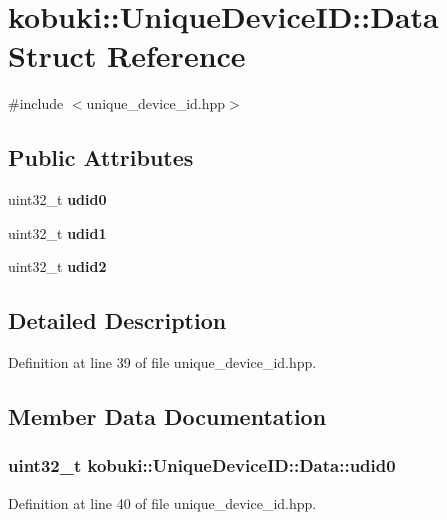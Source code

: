 \section{kobuki\-:\-:\-Unique\-Device\-I\-D\-:\-:\-Data \-Struct \-Reference}
\label{structkobuki_1_1UniqueDeviceID_1_1Data}


{\ttfamily \#include $<$unique\-\_\-device\-\_\-id.\-hpp$>$}

\subsection*{\-Public \-Attributes}
\begin{DoxyCompactItemize}
\item 
uint32\-\_\-t {\bf udid0}
\item 
uint32\-\_\-t {\bf udid1}
\item 
uint32\-\_\-t {\bf udid2}
\end{DoxyCompactItemize}


\subsection{\-Detailed \-Description}


\-Definition at line 39 of file unique\-\_\-device\-\_\-id.\-hpp.



\subsection{\-Member \-Data \-Documentation}
\subsubsection[{udid0}]{\setlength{\rightskip}{0pt plus 5cm}uint32\-\_\-t {\bf kobuki\-::\-Unique\-Device\-I\-D\-::\-Data\-::udid0}}\label{structkobuki_1_1UniqueDeviceID_1_1Data_a288e270b6772a5eba47f967c2216e995}


\-Definition at line 40 of file unique\-\_\-device\-\_\-id.\-hpp.

